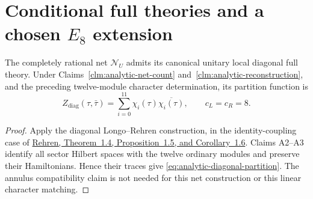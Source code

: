 \section{Conditional full theories and a chosen \texorpdfstring{$E_8$}{E8} extension}
\label{sec:analytic-full-theory}

\begin{proposition}
\label{prop:analytic-diagonal}
The completely rational net $\mathcal N_U$ admits its canonical unitary
local diagonal full theory.  Under Claims~\ref{clm:analytic-net-count}
and~\ref{clm:analytic-reconstruction}, and the preceding twelve-module
character determination, its partition function is
\begin{equation}
 Z_{\mathrm{diag}}(\tau,\bar\tau)
   =\sum_{i=0}^{11}\chi_i(\tau)\overline{\chi_i(\tau)},
 \qquad c_L=c_R=8.
 \label{eq:analytic-diagonal-partition}
\end{equation}
\end{proposition}
\begin{proof}
Apply the diagonal Longo--Rehren construction, in the identity-coupling
case of
\href{https://arxiv.org/html/math/9911149}
{Rehren, Theorem~1.4, Proposition~1.5, and Corollary~1.6}.
Claims A2--A3 identify all sector Hilbert spaces with the twelve ordinary
modules and preserve their Hamiltonians.  Hence their traces give
\eqref{eq:analytic-diagonal-partition}.  The annulus compatibility claim
is not needed for this net construction or this linear character matching.
\end{proof}

